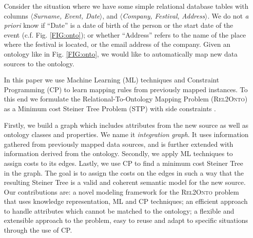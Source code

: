 \documentclass[letterpaper]{article} %
\newcommand{\authornote}[3]{
  {\fbox{\sc 
  #1}:$\blacktriangleright$\textcolor{#2}{\small{#3}}$\blacktriangleleft$}%
}
\newcommand{\npr}[1]{\authornote{NPR}{orange}{#1}}
\newcommand{\relonto}{\textsc{Rel2Onto}}
\newcommand{\forijcai}[1]{}
\begin{document}
Consider the situation where we have some simple relational database tables with columns $\langle$\textit{Surname, Event, Date}$\rangle$, and 
$\langle$\textit{Company, Festival, Address}$\rangle$.
We do not \textit{a priori} know if ``Date'' is a 
date of birth of the person or the start date of the event (c.f. Fig. \ref{FIG:onto}); or whether 
``Address'' refers to the name of the place where the festival is located, or the 
email address of the company. 
Given an ontology like in Fig. \ref{FIG:onto}, we would like to automatically map new data sources to  the 
ontology.\forijcai{\hfill$\square$}

In this paper we use Machine Learning (ML) techniques and Constraint Programming (CP) to learn mapping rules from previously mapped instances.
To this end we formulate the Relational-To-Ontology Mapping Problem (\relonto{}) as a Minimum cost Steiner Tree Problem (STP) with side constraints \cite{deuna2016steiner}.

Firstly, we build a graph which includes attributes
from the new
source as well as ontology classes and properties.
We name it \emph{integration graph}.
It uses information gathered from previously mapped data sources, and is further extended with information derived from the ontology.
Secondly, we apply ML techniques to 
assign costs to its edges. 
Lastly, we use CP to 
find a minimum cost Steiner Tree in the graph.
The goal is to assign the costs on the edges in such a way that the resulting 
Steiner Tree is a valid and coherent semantic model for the new source. 
Our contributions are:
	a novel modeling framework for the \relonto{} problem that uses knowledge representation, ML and CP techniques;
	an efficient approach to handle attributes which cannot be matched to 
	the ontology; \forijcai{through a new semantic labeling model and a new STP 
	model with additional nodes in the integration graph.}
	a flexible and extensible approach to the problem, easy to 
	reuse and adapt to specific situations through the use of CP.\forijcai{ allows introduction of additional constraints with no changes to the solver.} 
\end{document}
